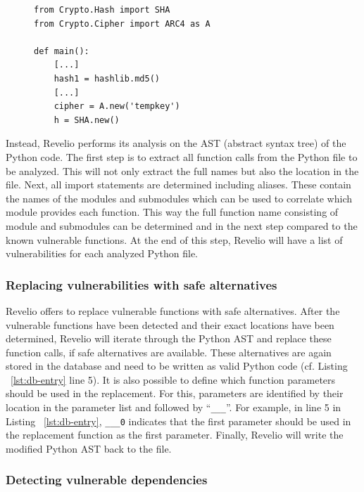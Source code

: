 \begin{figure}[!h]
    \centering
    \begin{lstlisting}[caption={Usage of vulnerable functions in Python},captionpos=b, label={lst:vulnerable-code}]
from Crypto.Hash import SHA
from Crypto.Cipher import ARC4 as A

def main():
    [...]
    hash1 = hashlib.md5()
    [...]
    cipher = A.new('tempkey')
    h = SHA.new()
\end{lstlisting}
\end{figure}

Instead, Revelio performs its analysis on the AST (abstract syntax tree) of the Python code. The first step is to extract all function calls from the Python file to be analyzed. This will not only extract the full names but also the location in the file. Next, all import statements are determined including aliases. These contain the names of the modules and submodules which can be used to correlate which module provides each function. This way the full function name consisting of module and submodules can be determined and in the next step compared to the known vulnerable functions. At the end of this step, Revelio will have a list of vulnerabilities for each analyzed Python file. 

\subsubsection{Replacing vulnerabilities with safe alternatives}

Revelio offers to replace vulnerable functions with safe alternatives. After the vulnerable functions have been detected and their exact locations have been determined, Revelio will iterate through the Python AST and replace these function calls, if safe alternatives are available. These alternatives are again stored in the database and need to be written as valid Python code (cf. Listing ~\ref{lst:db-entry} line 5). It is also possible to define which function parameters should be used in the replacement. For this, parameters are identified by their location in the parameter list and followed by \enquote{\texttt{\_\_\_}}. For example, in line 5 in Listing ~\ref{lst:db-entry}, \texttt{\_\_\_0} indicates that the first parameter should be used in the replacement function as the first parameter. Finally, Revelio will write the modified Python AST back to the file.

\subsubsection{Detecting vulnerable dependencies}

